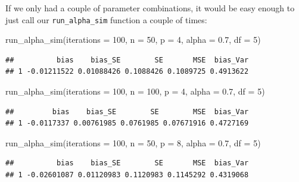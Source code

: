 \documentclass[
]{book}
\newenvironment{Shaded}{\begin{snugshade}}{\end{snugshade}}
\newcommand{\AttributeTok}[1]{\textcolor[rgb]{0.77,0.63,0.00}{#1}}
\newcommand{\DecValTok}[1]{\textcolor[rgb]{0.00,0.00,0.81}{#1}}
\newcommand{\FloatTok}[1]{\textcolor[rgb]{0.00,0.00,0.81}{#1}}
\newcommand{\FunctionTok}[1]{\textcolor[rgb]{0.00,0.00,0.00}{#1}}
\newcommand{\NormalTok}[1]{#1}
\begin{document}
If we only had a couple of parameter combinations, it would be easy enough to just call our \texttt{run\_alpha\_sim} function a couple of times:

\begin{Shaded}
\begin{Highlighting}[]
\FunctionTok{run\_alpha\_sim}\NormalTok{(}\AttributeTok{iterations =} \DecValTok{100}\NormalTok{, }\AttributeTok{n =} \DecValTok{50}\NormalTok{, }\AttributeTok{p =} \DecValTok{4}\NormalTok{, }\AttributeTok{alpha =} \FloatTok{0.7}\NormalTok{, }\AttributeTok{df =} \DecValTok{5}\NormalTok{)}
\end{Highlighting}
\end{Shaded}

\begin{verbatim}
##          bias    bias_SE        SE       MSE  bias_Var
## 1 -0.01211522 0.01088426 0.1088426 0.1089725 0.4913622
\end{verbatim}

\begin{Shaded}
\begin{Highlighting}[]
\FunctionTok{run\_alpha\_sim}\NormalTok{(}\AttributeTok{iterations =} \DecValTok{100}\NormalTok{, }\AttributeTok{n =} \DecValTok{100}\NormalTok{, }\AttributeTok{p =} \DecValTok{4}\NormalTok{, }\AttributeTok{alpha =} \FloatTok{0.7}\NormalTok{, }\AttributeTok{df =} \DecValTok{5}\NormalTok{)}
\end{Highlighting}
\end{Shaded}

\begin{verbatim}
##         bias    bias_SE        SE        MSE  bias_Var
## 1 -0.0117337 0.00761985 0.0761985 0.07671916 0.4727169
\end{verbatim}

\begin{Shaded}
\begin{Highlighting}[]
\FunctionTok{run\_alpha\_sim}\NormalTok{(}\AttributeTok{iterations =} \DecValTok{100}\NormalTok{, }\AttributeTok{n =} \DecValTok{50}\NormalTok{, }\AttributeTok{p =} \DecValTok{8}\NormalTok{, }\AttributeTok{alpha =} \FloatTok{0.7}\NormalTok{, }\AttributeTok{df =} \DecValTok{5}\NormalTok{)}
\end{Highlighting}
\end{Shaded}

\begin{verbatim}
##          bias    bias_SE        SE       MSE  bias_Var
## 1 -0.02601087 0.01120983 0.1120983 0.1145292 0.4319068
\end{verbatim}
\end{document}
